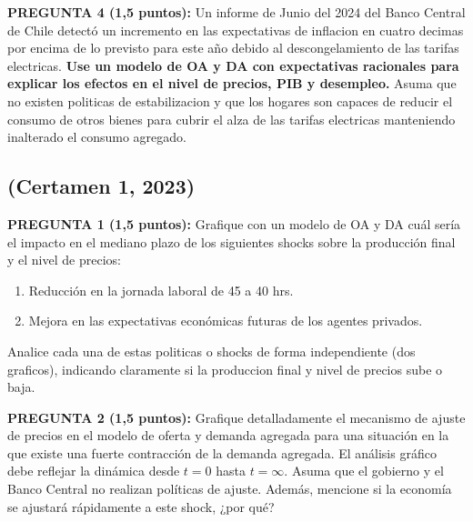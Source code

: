 \documentclass[11pt,addpoints]{article}
\begin{document}
\textbf{PREGUNTA 4 (1,5 puntos):}  
Un informe de Junio del 2024 del Banco Central de Chile detectó un incremento en las expectativas de inflacion en cuatro decimas por encima de lo previsto para este año debido al descongelamiento de las tarifas electricas. \textbf{Use un modelo de OA y DA con expectativas racionales para explicar los efectos en el nivel de precios, PIB y desempleo.}  Asuma que no existen politicas de estabilizacion y que los hogares son capaces de reducir el consumo de otros bienes para cubrir el alza de las tarifas electricas manteniendo inalterado el consumo agregado.


\newpage
\vspace*{0.05cm}
\subsection*{(Certamen 1, 2023)}
\textbf{PREGUNTA 1 (1,5 puntos):}  
Grafique con un modelo de OA y DA cuál sería el impacto en el mediano plazo de los siguientes shocks sobre la producción final y el nivel de precios:
\begin{enumerate}[label=\alph*)]
    \item Reducción en la jornada laboral de 45 a 40 hrs.  
    \item Mejora en las expectativas económicas futuras de los agentes privados.  
\end{enumerate}

\vspace*{0.1cm}

Analice cada una de estas politicas o shocks de forma independiente (dos graficos), indicando claramente si la produccion final y nivel de precios sube o baja.

\vspace{0.3cm}

\textbf{PREGUNTA 2 (1,5 puntos):}  
Grafique detalladamente el mecanismo de ajuste de precios en el modelo de oferta y demanda agregada para una situación en la que existe una fuerte contracción de la demanda agregada. El análisis gráfico debe reflejar la dinámica desde $t=0$ hasta $t=\infty$. Asuma que el gobierno y el Banco Central no realizan políticas de ajuste. Además, mencione si la economía se ajustará rápidamente a este shock, ¿por qué?

\vspace{0.3cm}
\end{document}
